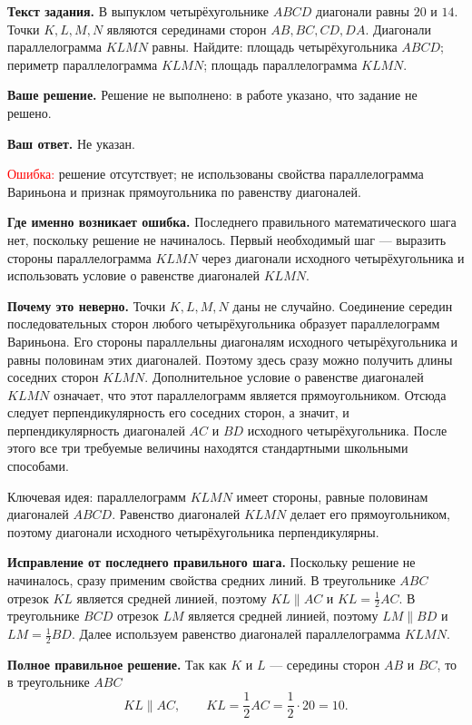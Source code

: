 \documentclass[12pt,a4paper]{article}
\begin{document}
\textbf{Текст задания.}
В выпуклом четырёхугольнике $ABCD$ диагонали равны $20$ и $14$. Точки $K,L,M,N$ являются серединами сторон $AB,BC,CD,DA$. Диагонали параллелограмма $KLMN$ равны. Найдите: площадь четырёхугольника $ABCD$; периметр параллелограмма $KLMN$; площадь параллелограмма $KLMN$.

\textbf{Ваше решение.}
Решение не выполнено: в работе указано, что задание не решено.

\textbf{Ваш ответ.}
Не указан.

\textcolor{red}{Ошибка:} решение отсутствует; не использованы свойства параллелограмма Вариньона и признак прямоугольника по равенству диагоналей.

\textbf{Где именно возникает ошибка.}
Последнего правильного математического шага нет, поскольку решение не начиналось. Первый необходимый шаг --- выразить стороны параллелограмма $KLMN$ через диагонали исходного четырёхугольника и использовать условие о равенстве диагоналей $KLMN$.

\textbf{Почему это неверно.}
Точки $K,L,M,N$ даны не случайно. Соединение середин последовательных сторон любого четырёхугольника образует параллелограмм Вариньона. Его стороны параллельны диагоналям исходного четырёхугольника и равны половинам этих диагоналей. Поэтому здесь сразу можно получить длины соседних сторон $KLMN$. Дополнительное условие о равенстве диагоналей $KLMN$ означает, что этот параллелограмм является прямоугольником. Отсюда следует перпендикулярность его соседних сторон, а значит, и перпендикулярность диагоналей $AC$ и $BD$ исходного четырёхугольника. После этого все три требуемые величины находятся стандартными школьными способами.

\textcolor{blue!60!black}{Ключевая идея:} параллелограмм $KLMN$ имеет стороны, равные половинам диагоналей $ABCD$. Равенство диагоналей $KLMN$ делает его прямоугольником, поэтому диагонали исходного четырёхугольника перпендикулярны.

\textbf{Исправление от последнего правильного шага.}
Поскольку решение не начиналось, сразу применим свойства средних линий. В треугольнике $ABC$ отрезок $KL$ является средней линией, поэтому $KL\parallel AC$ и $KL=\frac12 AC$. В треугольнике $BCD$ отрезок $LM$ является средней линией, поэтому $LM\parallel BD$ и $LM=\frac12 BD$. Далее используем равенство диагоналей параллелограмма $KLMN$.

\textbf{Полное правильное решение.}
Так как $K$ и $L$ --- середины сторон $AB$ и $BC$, то в треугольнике $ABC$
\[
KL\parallel AC,\qquad KL=\frac12 AC=\frac12\cdot20=10.
\]
\end{document}
